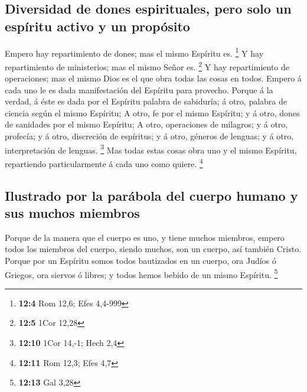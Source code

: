 \hypertarget{diversidad-de-dones-espirituales-pero-solo-un-espuxedritu-activo-y-un-propuxf3sito}{%
\subsection{Diversidad de dones espirituales, pero solo un espíritu
activo y un
propósito}\label{diversidad-de-dones-espirituales-pero-solo-un-espuxedritu-activo-y-un-propuxf3sito}}

 Empero hay repartimiento de dones; mas el mismo Espíritu
es. \footnote{\textbf{12:4} Rom 12,6; Efes 4,4-999}  Y hay
repartimiento de ministerios; mas el mismo Señor es. \footnote{\textbf{12:5}
  1Cor 12,28}  Y hay repartimiento de operaciones; mas el
mismo Dios es el que obra todas las cosas en todos.  Empero
á cada uno le es dada manifestación del Espíritu para provecho.
 Porque á la verdad, á éste es dada por el Espíritu palabra
de sabiduría; á otro, palabra de ciencia según el mismo Espíritu;
 A otro, fe por el mismo Espíritu; y á otro, dones de
sanidades por el mismo Espíritu;  A otro, operaciones de
milagros; y á otro, profecía; y á otro, discreción de espíritus; y á
otro, géneros de lenguas; y á otro, interpretación de lenguas.
\footnote{\textbf{12:10} 1Cor 14,-1; Hech 2,4}  Mas todas
estas cosas obra uno y el mismo Espíritu, repartiendo particularmente á
cada uno como quiere. \footnote{\textbf{12:11} Rom 12,3; Efes 4,7}

\hypertarget{ilustrado-por-la-paruxe1bola-del-cuerpo-humano-y-sus-muchos-miembros}{%
\subsection{Ilustrado por la parábola del cuerpo humano y sus muchos
miembros}\label{ilustrado-por-la-paruxe1bola-del-cuerpo-humano-y-sus-muchos-miembros}}

 Porque de la manera que el cuerpo es uno, y tiene muchos
miembros, empero todos los miembros del cuerpo, siendo muchos, son un
cuerpo, así también Cristo.  Porque por un Espíritu somos
todos bautizados en un cuerpo, ora Judíos ó Griegos, ora siervos ó
libres; y todos hemos bebido de un mismo Espíritu. \footnote{\textbf{12:13}
  Gal 3,28}

